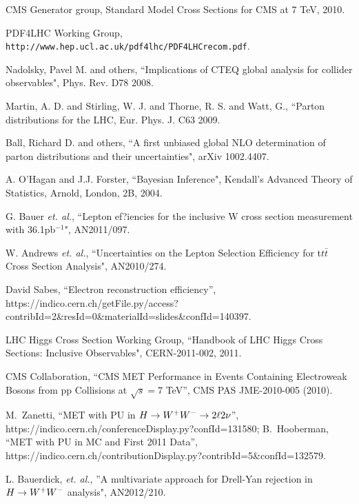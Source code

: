 CMS Generator group, Standard Model Cross Sections for CMS at 7 TeV, 2010.

PDF4LHC Working Group, 
{\tt http://www.hep.ucl.ac.uk/pdf4lhc/PDF4LHCrecom.pdf}.

Nadolsky, Pavel M. and others, ``Implications of CTEQ global analysis for 
collider observables", Phys. Rev. D78 2008.

Martin, A. D. and Stirling, W. J. and Thorne, R. S. and Watt, G., ``Parton 
distributions for the LHC, Eur. Phys. J. C63 2009.

Ball, Richard D. and others, ``A first unbiased global NLO determination 
of parton distributions and their uncertainties", arXiv 1002.4407.

A. O'Hagan and J.J. Forster, ``Bayesian Inference", Kendall's Advanced Theory of Statistics, 
Arnold, London, 2B, 2004.

G. Bauer {\it et. al.}, ``Lepton ef?iencies for the inclusive W cross section measurement with 36.1pb$^{-1}$", AN2011/097.

W. Andrews {\it et. al.}, ``Uncertainties on the Lepton Selection Efficiency for t$t\bar{t}$ Cross Section Analysis", AN2010/274.

David Sabes, ``Electron reconstruction efficiency'', \\
{\small https://indico.cern.ch/getFile.py/access?contribId=2\&resId=0\&materialId=slides\&confId=140397}.

LHC Higgs Cross Section Working Group, ``Handbook of LHC Higgs Cross Sections: 
Inclusive Observables", CERN-2011-002, 2011.

CMS Collaboration, ``CMS MET Performance in Events Containing Electroweak Bosons from pp Collisions at $\sqrt{s}=7$ TeV'', CMS PAS JME-2010-005 (2010).

M.~Zanetti, ``MET with PU in $H\to W^+W^- \to 2\ell 2\nu$'', \\
https://indico.cern.ch/conferenceDisplay.py?confId=131580; 
B.~Hooberman, ``MET with PU in MC and First 2011 Data'', https://indico.cern.ch/contributionDisplay.py?contribId=5\&confId=132579. 

L. Bauerdick, {\it et. al.}, ''A multivariate approach for Drell-Yan rejection in $H\to W^+W^-$ analysis", AN2012/210.


